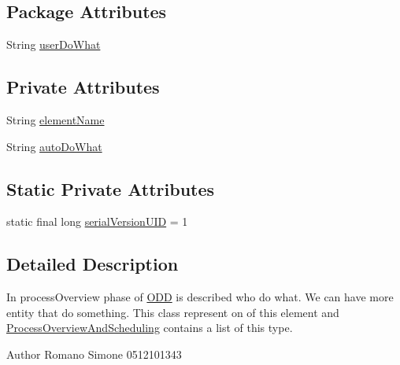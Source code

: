 \subsection*{Package Attributes}
\begin{DoxyCompactItemize}
\item 
String \hyperlink{classit_1_1isislab_1_1masonhelperdocumentation_1_1_o_d_d_1_1_process_overview_element_adf547a3ee1fe686d4e7cb2a446761a52}{user\-Do\-What}
\end{DoxyCompactItemize}
\subsection*{Private Attributes}
\begin{DoxyCompactItemize}
\item 
String \hyperlink{classit_1_1isislab_1_1masonhelperdocumentation_1_1_o_d_d_1_1_process_overview_element_a42984f1c7d0ac6f1c1fe5e8900cee0b9}{element\-Name}
\item 
String \hyperlink{classit_1_1isislab_1_1masonhelperdocumentation_1_1_o_d_d_1_1_process_overview_element_a089fb4d866c8dd54cc8deca8f51127e2}{auto\-Do\-What}
\end{DoxyCompactItemize}
\subsection*{Static Private Attributes}
\begin{DoxyCompactItemize}
\item 
static final long \hyperlink{classit_1_1isislab_1_1masonhelperdocumentation_1_1_o_d_d_1_1_process_overview_element_a45b2a88aa02008be6bb02926600ac8bd}{serial\-Version\-U\-I\-D} = 1
\end{DoxyCompactItemize}


\subsection{Detailed Description}
In process\-Overview phase of \hyperlink{classit_1_1isislab_1_1masonhelperdocumentation_1_1_o_d_d_1_1_o_d_d}{O\-D\-D} is described who do what. We can have more entity that do something. This class represent on of this element and \hyperlink{classit_1_1isislab_1_1masonhelperdocumentation_1_1_o_d_d_1_1_process_overview_and_scheduling}{Process\-Overview\-And\-Scheduling} contains a list of this type. \begin{DoxyAuthor}{Author}
Romano Simone 0512101343 
\end{DoxyAuthor}



